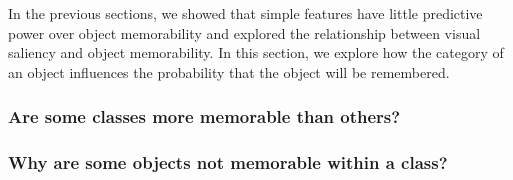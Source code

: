 In the previous sections, we showed that simple features have little predictive power over object memorability and explored the relationship between visual saliency and object memorability. In this section, we explore how the category of an object influences the probability that the object will be remembered.

\subsubsection{Are some classes more memorable than others?}



\subsubsection{Why are some objects not memorable within a class?}



